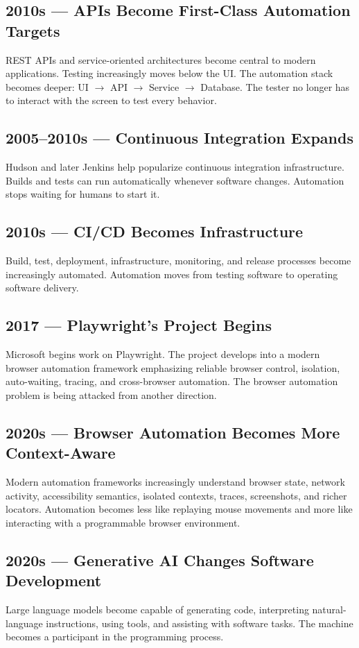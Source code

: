 \documentclass[11pt,twoside]{book}
\begin{document}
\subsection*{2010s — APIs Become First-Class Automation Targets}
REST APIs and service-oriented architectures become central to modern applications.
Testing increasingly moves below the UI.
The automation stack becomes deeper: UI $\rightarrow$ API $\rightarrow$ Service $\rightarrow$ Database.
The tester no longer has to interact with the screen to test every behavior.

\subsection*{2005–2010s — Continuous Integration Expands}
Hudson and later Jenkins help popularize continuous integration infrastructure.
Builds and tests can run automatically whenever software changes.
Automation stops waiting for humans to start it.

\subsection*{2010s — CI/CD Becomes Infrastructure}
Build, test, deployment, infrastructure, monitoring, and release processes become increasingly automated.
Automation moves from testing software to operating software delivery.

\subsection*{2017 — Playwright's Project Begins}
Microsoft begins work on Playwright.
The project develops into a modern browser automation framework emphasizing reliable browser control, isolation, auto-waiting, tracing, and cross-browser automation.
The browser automation problem is being attacked from another direction.

\subsection*{2020s — Browser Automation Becomes More Context-Aware}
Modern automation frameworks increasingly understand browser state, network activity, accessibility semantics, isolated contexts, traces, screenshots, and richer locators.
Automation becomes less like replaying mouse movements and more like interacting with a programmable browser environment.

\subsection*{2020s — Generative AI Changes Software Development}
Large language models become capable of generating code, interpreting natural-language instructions, using tools, and assisting with software tasks.
The machine becomes a participant in the programming process.
\end{document}
